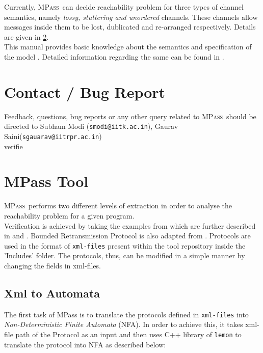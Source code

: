 \documentclass[a4paper]{article}
\newcommand{\MPass}{\textsc{MPass}}
\begin{document}
Currently, \MPass\ can decide reachability problem for three types of channel semantics, 
namely \emph{lossy, stuttering and unordered} channels. These channels allow messages inside them 
to be lost, dublicated and re-arranged respectively. Details are
given in \cref{sec:logic}.\\


This manual provides basic knowledge about the semantics and specification of the model .
Detailed information regarding the same can be found in \cite{AAC13}.\\

\section{Contact / Bug Report}

Feedback, questions, bug reports or any other query related to \MPass\ should be directed to 
Subham Modi ({\tt smodi@iitk.ac.in}), Gaurav Saini({\tt sgauarav@iitrpr.ac.in}) \\
verifie
\section{MPass Tool}\label{sec:logic}

\MPass\ performs two different levels of extraction in order to analyse the reachability 
problem for a given program.\\

Verification is achieved by taking the examples from \cite{JRSVgit} 
which are further described in \cite{MPSV11} and \cite{RSV11}.
Bounded Retransmission Protocol is also adapted from \cite{AABJ04}.
Protocols are used in the format of {\tt xml-files} present within the tool repository inside the 'Includes' folder.
The protocols, thus, can be modified in a simple manner by changing the fields in xml-files.

\subsection{Xml to Automata}

The first task of MPass is to translate the protocols defined in {\tt xml-files} into 
\emph{Non-Deterministic Finite Automata} (NFA). In order to achieve this, it takes xml-file path of the Protocol 
as an input and then uses C++ library of {\tt lemon} to translate the protocol into NFA as described below:\\
\end{document}
